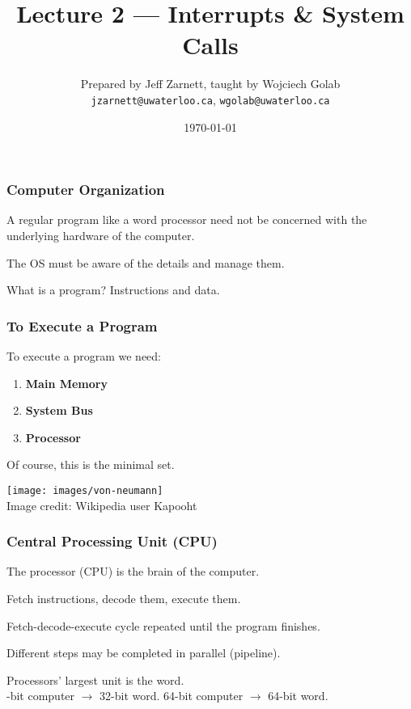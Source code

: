 

\title{Lecture 2 --- Interrupts \& System Calls }

\author{Prepared by Jeff Zarnett, taught by Wojciech Golab \\ \small \texttt{jzarnett@uwaterloo.ca}, \texttt{wgolab@uwaterloo.ca}}
\date{\today}




\begin{frame}
	\titlepage

\end{frame}

\begin{frame}
	\frametitle{Computer Organization}

	A regular program like a word processor need not be concerned with the underlying hardware of the computer.

	The OS must be aware of the details and manage them.

	What is a program? Instructions and data.


\end{frame}

\begin{frame}
	\frametitle{To Execute a Program}

	To execute a program we need:

	\begin{enumerate}
		\item \textbf{Main Memory}
		\item \textbf{System Bus}
		\item \textbf{Processor}
	\end{enumerate}

	Of course, this is the minimal set.

	\begin{center}
		\texttt{[image: images/von-neumann]}\\
		Image credit: Wikipedia user Kapooht
	\end{center}



\end{frame}


\begin{frame}
	\frametitle{Central Processing Unit (CPU)}

	The processor (CPU) is the brain of the computer.

	Fetch instructions, decode them, execute them.

	Fetch-decode-execute cycle repeated until the program finishes.

	Different steps may be completed in parallel (\alert{pipeline}).

	Processors' largest unit is the \alert{word}.\\
	-bit computer $\rightarrow$ 32-bit word. 64-bit computer $\rightarrow$ 64-bit word.

\end{frame}


